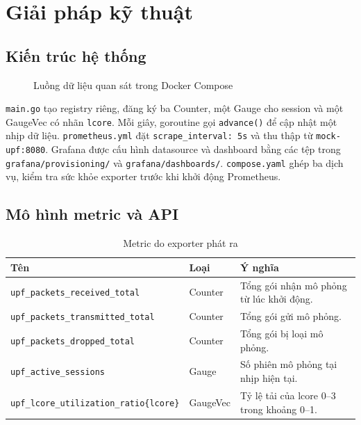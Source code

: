 \documentclass[12pt,a4paper]{report}
\newcommand{\code}[1]{\texttt{#1}}
\begin{document}
\chapter{Giải pháp kỹ thuật}
\section{Kiến trúc hệ thống}
\begin{figure}[H]
\centering
{}
\caption{Luồng dữ liệu quan sát trong Docker Compose}
\end{figure}

\code{main.go} tạo registry riêng, đăng ký ba Counter, một Gauge cho session và một GaugeVec có nhãn \code{lcore}. Mỗi giây, goroutine gọi \code{advance()} để cập nhật một nhịp dữ liệu. \code{prometheus.yml} đặt \code{scrape\_interval: 5s} và thu thập từ \code{mock-upf:8080}. Grafana được cấu hình datasource và dashboard bằng các tệp trong \code{grafana/provisioning/} và \code{grafana/dashboards/}. \code{compose.yaml} ghép ba dịch vụ, kiểm tra sức khỏe exporter trước khi khởi động Prometheus.

\section{Mô hình metric và API}
\begin{table}[H]
\centering\small
\caption{Metric do exporter phát ra}
\begin{tabularx}{\textwidth}{p{5.5cm}p{1.6cm}Y}
\toprule
\textbf{Tên} & \textbf{Loại} & \textbf{Ý nghĩa} \\
\midrule
\code{upf\_packets\_received\_total} & Counter & Tổng gói nhận mô phỏng từ lúc khởi động. \\
\code{upf\_packets\_transmitted\_total} & Counter & Tổng gói gửi mô phỏng. \\
\code{upf\_packets\_dropped\_total} & Counter & Tổng gói bị loại mô phỏng. \\
\code{upf\_active\_sessions} & Gauge & Số phiên mô phỏng tại nhịp hiện tại. \\
\code{upf\_lcore\_utilization\_ratio\{lcore\}} & GaugeVec & Tỷ lệ tải của lcore 0--3 trong khoảng 0--1. \\
\bottomrule
\end{tabularx}
\end{table}
\end{document}
